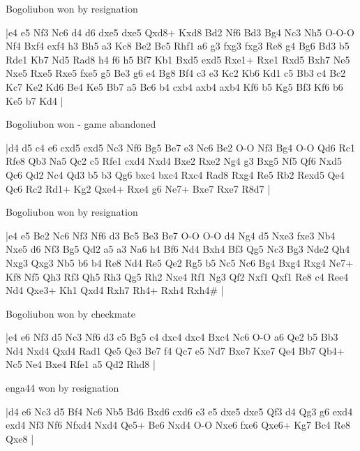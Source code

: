 \showboard

Bogoliubon won by resignation

\makegametitle
|e4 e5 Nf3 Nc6 d4 d6 dxe5 dxe5 Qxd8+ Kxd8 Bd2 Nf6 Bd3 Bg4 Nc3 Nh5 O-O-O Nf4 Bxf4 exf4 h3 Bh5 a3 Kc8 Be2 Bc5 Rhf1 a6 g3 fxg3 fxg3 Re8 g4 Bg6 Bd3 b5 Rde1 Kb7 Nd5 Rad8 h4 f6 h5 Bf7 Kb1 Bxd5 exd5 Rxe1+ Rxe1 Rxd5 Bxh7 Ne5 Nxe5 Rxe5 Rxe5 fxe5 g5 Be3 g6 e4 Bg8 Bf4 c3 e3 Kc2 Kb6 Kd1 c5 Bb3 c4 Bc2 Kc7 Ke2 Kd6 Be4 Ke5 Bb7 a5 Bc6 b4 cxb4 axb4 axb4 Kf6 b5 Kg5 Bf3 Kf6 b6 Ke5 b7 Kd4  |

\showboard

Bogoliubon won - game abandoned

\makegametitle
|d4 d5 c4 e6 cxd5 exd5 Nc3 Nf6 Bg5 Be7 e3 Nc6 Be2 O-O Nf3 Bg4 O-O Qd6 Rc1 Rfe8 Qb3 Na5 Qc2 c5 Rfe1 cxd4 Nxd4 Bxe2 Rxe2 Ng4 g3 Bxg5 Nf5 Qf6 Nxd5 Qc6 Qd2 Nc4 Qd3 b5 b3 Qg6 bxc4 bxc4 Rxc4 Rad8 Rxg4 Re5 Rb2 Rexd5 Qe4 Qc6 Rc2 Rd1+ Kg2 Qxe4+ Rxe4 g6 Ne7+ Bxe7 Rxe7 R8d7  |

\showboard

Bogoliubon won by resignation

\makegametitle
|e4 e5 Be2 Nc6 Nf3 Nf6 d3 Bc5 Be3 Be7 O-O O-O d4 Ng4 d5 Nxe3 fxe3 Nb4 Nxe5 d6 Nf3 Bg5 Qd2 a5 a3 Na6 h4 Bf6 Nd4 Bxh4 Bf3 Qg5 Nc3 Bg3 Nde2 Qh4 Nxg3 Qxg3 Nb5 b6 b4 Re8 Nd4 Re5 Qe2 Rg5 b5 Nc5 Nc6 Bg4 Bxg4 Rxg4 Ne7+ Kf8 Nf5 Qh3 Rf3 Qh5 Rh3 Qg5 Rh2 Nxe4 Rf1 Ng3 Qf2 Nxf1 Qxf1 Re8 c4 Ree4 Nd4 Qxe3+ Kh1 Qxd4 Rxh7 Rh4+ Rxh4 Rxh4\#  |

\showboard

Bogoliubon won by checkmate

\makegametitle
|e4 e6 Nf3 d5 Nc3 Nf6 d3 c5 Bg5 c4 dxc4 dxc4 Bxc4 Nc6 O-O a6 Qe2 b5 Bb3 Nd4 Nxd4 Qxd4 Rad1 Qe5 Qe3 Be7 f4 Qc7 e5 Nd7 Bxe7 Kxe7 Qe4 Bb7 Qb4+ Nc5 Ne4 Bxe4 Rfe1 a5 Qd2 Rhd8  |

\showboard

enga44 won by resignation

\makegametitle
|d4 e6 Nc3 d5 Bf4 Nc6 Nb5 Bd6 Bxd6 cxd6 e3 e5 dxe5 dxe5 Qf3 d4 Qg3 g6 exd4 exd4 Nf3 Nf6 Nfxd4 Nxd4 Qe5+ Be6 Nxd4 O-O Nxe6 fxe6 Qxe6+ Kg7 Bc4 Re8 Qxe8  |

